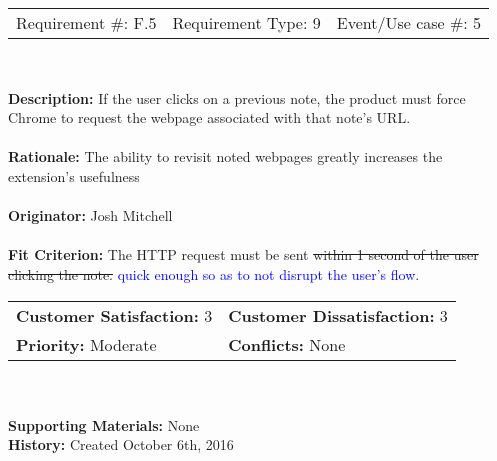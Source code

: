 \documentclass[12pt, titlepage]{article}
\begin{document}
\begin{framed}
	
	\begin{center}
		
		\begin{tabular}{ l c r }
			Requirement \#: F.5 & Requirement Type: 9 & Event/Use case \#: 5\\
		\end{tabular} \\
	\end{center}
	\textbf{Description:} If the user clicks on a previous note, the product 
	must force Chrome to request the webpage associated with that note's URL.\\
	\\
	\textbf{Rationale:} The ability to revisit noted webpages greatly increases 
	the extension's usefulness \\
	\\
	\textbf{Originator:} Josh Mitchell \\
	\\
	\textbf{Fit Criterion:} The HTTP request must be sent \sout{within 1 second 
	of the user clicking the note.} \textcolor{blue}{quick enough so as to not 
	disrupt the user's flow.} \\
	
	\begin{tabular}{ll}
		\textbf{Customer Satisfaction:} 3 & \textbf{Customer Dissatisfaction:} 
		3 \\
		\textbf{Priority:} Moderate & \textbf{Conflicts:} None\\
	\end{tabular} \\
	\\
	\textbf{Supporting Materials:} None \\
	\textbf{History:} Created October 6th, 2016
	
\end{framed}
\end{document}
